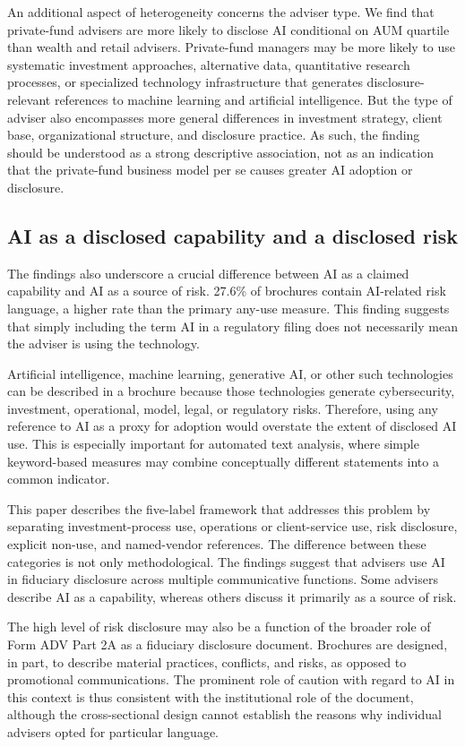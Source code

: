 \documentclass[utf8]{FrontiersinHarvard}
\begin{document}
An additional aspect of heterogeneity concerns the adviser type. We find that private-fund advisers are more likely to disclose AI conditional on AUM quartile than wealth and retail advisers. Private-fund managers may be more likely to use systematic investment approaches, alternative data, quantitative research processes, or specialized technology infrastructure that generates disclosure-relevant references to machine learning and artificial intelligence. But the type of adviser also encompasses more general differences in investment strategy, client base, organizational structure, and disclosure practice. As such, the finding should be understood as a strong descriptive association, not as an indication that the private-fund business model per se causes greater AI adoption or disclosure.

\subsection{AI as a disclosed capability and a disclosed risk}

The findings also underscore a crucial difference between AI as a claimed capability and AI as a source of risk. 27.6\% of brochures contain AI-related risk language, a higher rate than the primary any-use measure. This finding suggests that simply including the term AI in a regulatory filing does not necessarily mean the adviser is using the technology.

Artificial intelligence, machine learning, generative AI, or other such technologies can be described in a brochure because those technologies generate cybersecurity, investment, operational, model, legal, or regulatory risks. Therefore, using any reference to AI as a proxy for adoption would overstate the extent of disclosed AI use. This is especially important for automated text analysis, where simple keyword-based measures may combine conceptually different statements into a common indicator.

This paper describes the five-label framework that addresses this problem by separating investment-process use, operations or client-service use, risk disclosure, explicit non-use, and named-vendor references. The difference between these categories is not only methodological. The findings suggest that advisers use AI in fiduciary disclosure across multiple communicative functions. Some advisers describe AI as a capability, whereas others discuss it primarily as a source of risk.

The high level of risk disclosure may also be a function of the broader role of Form ADV Part 2A as a fiduciary disclosure document. Brochures are designed, in part, to describe material practices, conflicts, and risks, as opposed to promotional communications. The prominent role of caution with regard to AI in this context is thus consistent with the institutional role of the document, although the cross-sectional design cannot establish the reasons why individual advisers opted for particular language.
\end{document}
